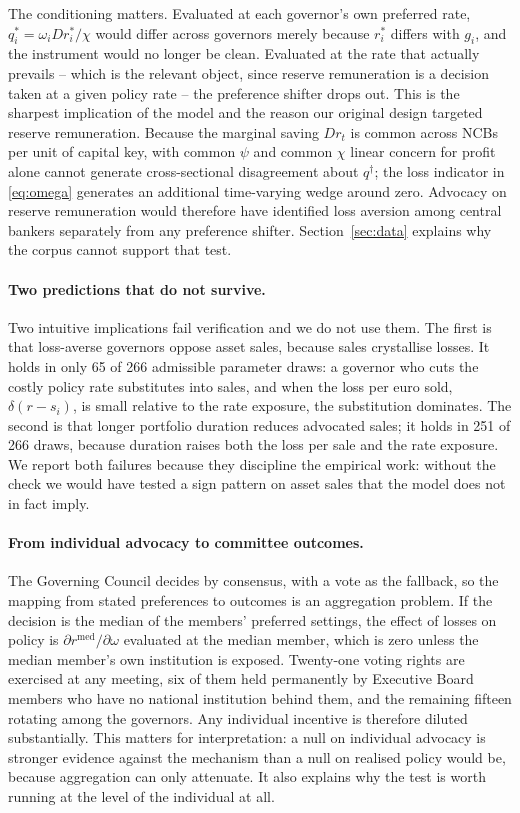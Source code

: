 \documentclass[11pt]{article}
\theoremstyle{plain}
\begin{document}
The conditioning matters. Evaluated at each governor's own preferred rate, $q_i^* = \omega_i D r_i^*/\chi$ would differ across governors merely because $r_i^*$ differs with $g_i$, and the instrument would no longer be clean. Evaluated at the rate that actually prevails -- which is the relevant object, since reserve remuneration is a decision taken at a given policy rate -- the preference shifter drops out. This is the sharpest implication of the model and the reason our original design targeted reserve remuneration. Because the marginal saving $Dr_t$ is common across NCBs per unit of capital key, with common $\psi$ and common $\chi$ linear concern for profit alone cannot generate cross-sectional disagreement about $q^\dagger$; the loss indicator in \eqref{eq:omega} generates an additional time-varying wedge around zero. Advocacy on reserve remuneration would therefore have identified loss aversion among central bankers separately from any preference shifter. Section~\ref{sec:data} explains why the corpus cannot support that test.

\paragraph{Two predictions that do not survive.}
Two intuitive implications fail verification and we do not use them. The first is that loss-averse governors oppose asset sales, because sales crystallise losses. It holds in only 65 of 266 admissible parameter draws: a governor who cuts the costly policy rate substitutes into sales, and when the loss per euro sold, $\delta(r-s_i)$, is small relative to the rate exposure, the substitution dominates. The second is that longer portfolio duration reduces advocated sales; it holds in 251 of 266 draws, because duration raises both the loss per sale and the rate exposure. We report both failures because they discipline the empirical work: without the check we would have tested a sign pattern on asset sales that the model does not in fact imply.

\paragraph{From individual advocacy to committee outcomes.}
The Governing Council decides by consensus, with a vote as the fallback, so the mapping from stated preferences to outcomes is an aggregation problem. If the decision is the median of the members' preferred settings, the effect of losses on policy is $\partial r^{\text{med}}/\partial \omega$ evaluated at the median member, which is zero unless the median member's own institution is exposed. Twenty-one voting rights are exercised at any meeting, six of them held permanently by Executive Board members who have no national institution behind them, and the remaining fifteen rotating among the governors. Any individual incentive is therefore diluted substantially. This matters for interpretation: a null on individual advocacy is stronger evidence against the mechanism than a null on realised policy would be, because aggregation can only attenuate. It also explains why the test is worth running at the level of the individual at all.
\end{document}
